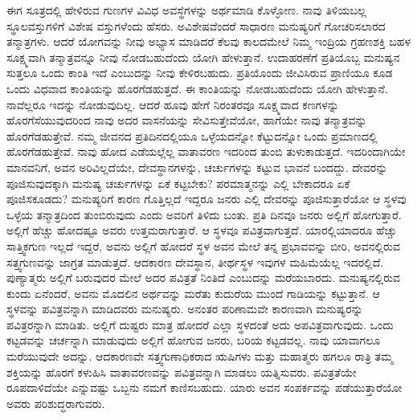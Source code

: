 ಈಗ ಸೂತ್ರದಲ್ಲಿ ಹೇಳಿರುವ ಗುಣಗಳ ವಿವಿಧ ಅವಸ್ಥೆಗಳನ್ನು ಅರ್ಥಮಾಡಿ ಕೊಳ್ಳೋಣ. ನಾವು ತಿಳಿಯಬಲ್ಲ ಸ್ಥೂಲವಸ್ತುಗಳಿಗೆ ವಿಶೇಷ ವಸ್ತುಗಳೆಂದು ಹೆಸರು. ಅವಿಶೇಷವೆಂದರೆ ಸಾಧಾರಣ ಮನುಷ್ಯರಿಗೆ ಗೋಚರಿಸಲಾರದ ತನ್ಮಾತ್ರಗಳು. ಆದರೆ ಯೋಗವನ್ನು ನೀವು ಅಭ್ಯಾಸ ಮಾಡಿದರೆ ಕೆಲವು ಕಾಲದಮೇಲೆ ನಿಮ್ಮ ಇಂದ್ರಿಯ ಗ್ರಹಣಶಕ್ತಿ ಬಹಳ ಸೂಕ್ಷ್ಮವಾಗಿ ತನ್ಮಾತ್ರವನ್ನೂ ನೀವು ನೋಡಬಹುದೆಂದು ಯೋಗಿ ಹೇಳುತ್ತಾನೆ. ಉದಾಹರಣೆಗೆ ಪ್ರತಿಯೊಬ್ಬ ಮನುಷ್ಯನ ಸುತ್ತಲೂ ಒಂದು ಕಾಂತಿ ಇದೆ ಎಂಬುದನ್ನು ನೀವು ಕೇಳಿರಬಹುದು. ಪ್ರತಿಯೊಂದು ಜೀವಿಸಿರುವ ಪ್ರಾಣಿಯೂ ಕೂಡ ಒಂದು ವಿಧವಾದ ಕಾಂತಿಯನ್ನು ಹೊರಗೆಡಹುತ್ತದೆ. ಈ ಕಾಂತಿಯನ್ನು ನೋಡಬಹುದೆಂದು ಯೋಗಿ ಹೇಳುತ್ತಾನೆ. ನಾವೆಲ್ಲರೂ ಇದನ್ನು ನೋಡುವುದಿಲ್ಲ. ಆದರೆ ಹೂವು ಹೇಗೆ ನಿರಂತರವೂ ಸೂಕ್ಷ್ಮವಾದ ಕಣಗಳನ್ನು ಹೊರಗೆಸೆಯುವುದರಿಂದ ನಾವು ಅದರ ವಾಸನೆಯನ್ನು ಸೇವಿಸುತ್ತೇವೆಯೋ, ಹಾಗೆಯೇ ನಾವು ತನ್ಮಾತ್ರವನ್ನು ಹೊರಗೆಡಹುತ್ತೇವೆ. ನಮ್ಮ ಜೀವನದ ಪ್ರತಿದಿನದಲ್ಲಿಯೂ ಒಳ್ಳೆಯದನ್ನೋ ಕೆಟ್ಟುದನ್ನೋ ಒಂದು ಪ್ರಮಾಣದಲ್ಲಿ ಹೊರಗೆಡಹುತ್ತೇವೆ. ನಾವು ಹೋದ ಎಡೆಯಲ್ಲೆಲ್ಲ ವಾತಾವರಣ ಇದರಿಂದ ತುಂಬಿ ತುಳುಕಾಡುತ್ತದೆ. ಇದರಿಂದಾಗಿಯೇ ಮಾನವನಿಗೆ, ಅವನ ಅರಿವಿಲ್ಲದೆಯೇ, ದೇವಸ್ಥಾನಗಳನ್ನು, ಚರ್ಚುಗಳನ್ನು ಕಟ್ಟುವ ಭಾವನೆ ಬಂದದ್ದು. ದೇವರನ್ನು ಪೂಜಿಸುವುದಕ್ಕಾಗಿ ಮನುಷ್ಯ ಚರ್ಚುಗಳನ್ನು ಏಕೆ ಕಟ್ಟಬೇಕು? ಪರಮಾತ್ಮನನ್ನು ಎಲ್ಲಿ ಬೇಕಾದರೂ ಏಕೆ ಪೂಜಿಸಕೂಡದು? ಮನುಷ್ಯರಿಗೆ ಕಾರಣ ಗೊತ್ತಿಲ್ಲದೆ ಇದ್ದರೂ ಜನರು ಎಲ್ಲಿ ದೇವರನ್ನು ಪೂಜಿಸುತ್ತಾರೆಯೋ ಆ ಸ್ಥಳವು ಒಳ್ಳೆಯ ತನ್ಮಾತ್ರದಿಂದ ತುಂಬಿರುವುದು ಎಂದು ಅವರಿಗೆ ತಿಳಿದು ಬಂತು. ಪ್ರತಿ ದಿನವೂ ಜನರು ಅಲ್ಲಿಗೆ ಹೋಗುತ್ತಾರೆ. ಅಲ್ಲಿಗೆ ಹೆಚ್ಚು ಹೋದಷ್ಟೂ ಅವರು ಉತ್ತಮರಾಗುತ್ತಾರೆ. ಆ ಸ್ಥಳವೂ ಪವಿತ್ರವಾಗುತ್ತದೆ. ಯಾರಲ್ಲಿಯಾದರೂ ಹೆಚ್ಚು ಸಾತ್ತ್ವಿಕಗುಣ ಇಲ್ಲದೆ ಇದ್ದರೆ, ಅವನು ಅಲ್ಲಿಗೆ ಹೋದರೆ ಸ್ಥಳ ಅವನ ಮೇಲೆ ತನ್ನ ಪ್ರಭಾವವನ್ನು ಬೀರಿ, ಅವನಲ್ಲಿರುವ ಸತ್ತ್ವಗುಣವನ್ನು ಜಾಗ್ರತ ಮಾಡುತ್ತದೆ. ಆದಕಾರಣ ದೇವಸ್ಥಾನ, ತೀರ್ಥಸ್ಥಳ ಇವುಗಳ ಮಹಿಮೆಯೆಲ್ಲ ಇದರಲ್ಲಿದೆ. ಪುಣ್ಯಾತ್ಮರು ಅಲ್ಲಿಗೆ ಬರುವುದರ ಮೇಲೆ ಅದರ ಪವಿತ್ರತೆ ನಿಂತಿದೆ ಎಂಬುದನ್ನು ಮರೆಯಬಾರದು. ಮನುಷ್ಯನಲ್ಲಿರುವ ಕುಂದು ಏನೆಂದರೆ, ಅವನು ಮೊದಲಿನ ಅರ್ಥವನ್ನು ಮರೆತು ಕುದುರೆಯ ಮುಂದೆ ಗಾಡಿಯನ್ನು ಕಟ್ಟುತ್ತಾನೆ. ಆ ಸ್ಥಳವನ್ನು ಪವಿತ್ರವನ್ನಾಗಿ ಮಾಡಿದವರು ಮನುಷ್ಯರು. ಅನಂತರ ಪರಿಣಾಮವೇ ಕಾರಣವಾಗಿ ಮನುಷ್ಯರನ್ನು ಪವಿತ್ರರನ್ನಾಗಿ ಮಾಡಿತು. ಅಲ್ಲಿಗೆ ದುಷ್ಟರು ಮಾತ್ರ ಹೋದರೆ ಎಲ್ಲಾ ಸ್ಥಳದಂತೆ ಅದು ಅಪವಿತ್ರವಾಗುವುದು. ಒಂದು ಕಟ್ಟಡವನ್ನು ಚರ್ಚನ್ನಾಗಿ ಮಾಡುವುದು ಅಲ್ಲಿಗೆ ಹೋಗುವ ಜನರು, ಬರಿಯ ಕಟ್ಟಡವಲ್ಲ. ನಾವು ಯಾವಾಗಲೂ ಮರೆಯುವುದೇ ಅದನ್ನು. ಆದಕಾರಣವೇ ಸತ್ತ್ವಗುಣಾಧಿಕರಾದ ಋಷಿಗಳು ಮತ್ತು ಮಹಾತ್ಮರು ಹಗಲೂ ರಾತ್ರಿ ತಮ್ಮ ಶಕ್ತಿಯನ್ನು ಹೊರಗೆ ಕಳುಹಿಸಿ ವಾತಾವರಣವನ್ನು ಪವಿತ್ರವನ್ನಾಗಿ ಮಾಡಲು ಯತ್ನಿಸುವರು. ಪವಿತ್ರತೆಯೇ ರೂಪದಾಳಿದೆಯೇ ಎನ್ನುವಷ್ಟು ಒಬ್ಬನು ನಮಗೆ ಕಾಣಿಸಬಹುದು. ಯಾರು ಅವನ ಸಂಪರ್ಕವನ್ನು ಪಡೆಯುತ್ತಾರೆಯೋ ಅವರು ಪರಿಶುದ್ಧರಾಗುವರು. 

